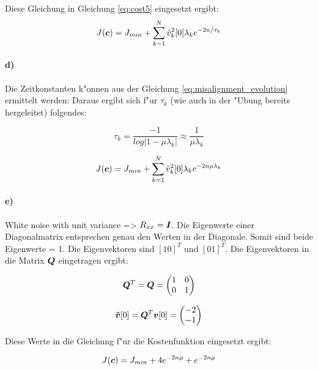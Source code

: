 Diese Gleichung in Gleichung \ref{eq:cost5} eingesetzt ergibt:
\begin{equation}
 J(\bm{c}) = J_{min} + \sum_{k=1}^N \tilde{v}_k^2[0] \lambda_k e^{-2n/\tau_k}
\label{eq:cost6}
\end{equation}

\paragraph{d)}

Die Zeitkonstanten k"onnen aus der Gleichung \ref{eq:misalignment_evolution} ermittelt werden:
Daraus ergibt sich f"ur $\tau_k$ (wie auch in der "Ubung bereits hergeleitet) folgendes:

\begin{equation}
 \tau_k = \frac{-1}{log|1-\mu \lambda_k|}  \approx \frac{1}{\mu \lambda_k}
\end{equation}

\begin{equation}
 J(\bm{c}) = J_{min} + \sum_{k=1}^N \tilde{v}_k^2[0] \lambda_k e^{-2n \mu \lambda_k}
\label{eq:cost7}
\end{equation}

\paragraph{e)}

White noise with unit variance => $R_{xx} = \bm{I}$. Die Eigenwerte einer Diagonalmatrix entsprechen genau
den Werten in der Diagonale. Somit sind beide Eigenwerte = 1.
Die Eigenvektoren sind $[1 0]^T$ und $[0 1]^T$. Die Eigenvektoren in die Matrix $\bm{Q}$ eingetragen ergibt:

\begin{equation}
 \bm{Q}^T = \bm{Q} = \begin{pmatrix} 1 & 0 \\ 0 & 1 \end{pmatrix}
\end{equation}

\begin{equation}
 \bm{\tilde{v}}[0] = \bm{Q}^T \bm{v}[0] = \begin{pmatrix} -2 \\ -1 \end{pmatrix}
\end{equation}

Diese Werte in die Gleichung f"ur die Kostenfunktion eingesetzt ergibt:

\begin{equation}
 J(\bm{c}) = J_{min} + 4e^{-2n\mu} + e^{-2n\mu}
\label{eq:cost_example}
\end{equation}